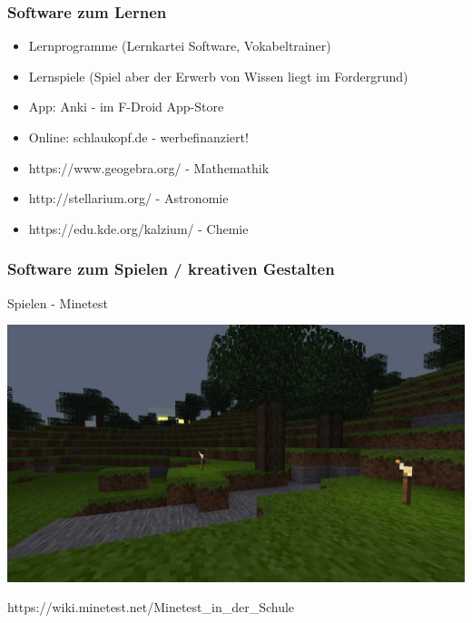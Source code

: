\documentclass[12pt]{beamer}
\begin{document}
\begin{frame}
	\frametitle{Software zum Lernen}
	\begin{itemize}
		\item<2-> Lernprogramme (Lernkartei Software, Vokabeltrainer)
	    \item<3-> Lernspiele (Spiel aber der Erwerb von Wissen liegt im Fordergrund)
	\end{itemize}
	\begin{itemize}
		\item<5-> App: Anki - im F-Droid App-Store
	    \item<6-> Online: schlaukopf.de - werbefinanziert!
	\end{itemize}
	\begin{itemize}
		\item<8-> https://www.geogebra.org/ - Mathemathik
		\item<9-> http://stellarium.org/ - Astronomie
		\item<10-> https://edu.kde.org/kalzium/ - Chemie
	\end{itemize}
\end{frame}

\begin{frame}
	\frametitle{Software zum Spielen / kreativen Gestalten}
	Spielen - Minetest
	\begin{center}
		\includegraphics[height=0.6\textheight]{img/minetest.jpg}
	\end{center}
	https://wiki.minetest.net/Minetest\_in\_der\_Schule
\end{frame}
\end{document}

